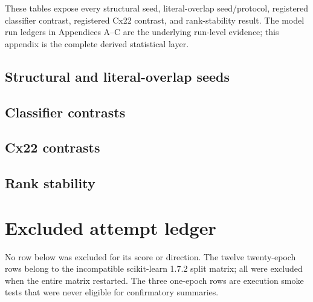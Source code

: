 \documentclass[11pt,oneside]{report}
\begin{document}
These tables expose every structural seed, literal-overlap seed/protocol, registered classifier contrast, registered Cx22 contrast, and rank-stability result. The model run ledgers in Appendices A--C are the underlying run-level evidence; this appendix is the complete derived statistical layer.

\section{Structural and literal-overlap seeds}

{\small
\setlength{\tabcolsep}{3pt}


}

\begin{landscape}
\section{Classifier contrasts}
\scriptsize
\setlength{\tabcolsep}{3pt}

\end{landscape}

\begin{landscape}
\section{Cx22 contrasts}
\scriptsize
\setlength{\tabcolsep}{3pt}

\end{landscape}

\section{Rank stability}

{\scriptsize
\setlength{\tabcolsep}{3pt}

}

\chapter{Excluded attempt ledger}

No row below was excluded for its score or direction. The twelve twenty-epoch rows belong to the incompatible scikit-learn 1.7.2 split matrix; all were excluded when the entire matrix restarted. The three one-epoch rows are execution smoke tests that were never eligible for confirmatory summaries.

\begin{landscape}
\small
\setlength{\tabcolsep}{4pt}

\end{landscape}
\end{document}
